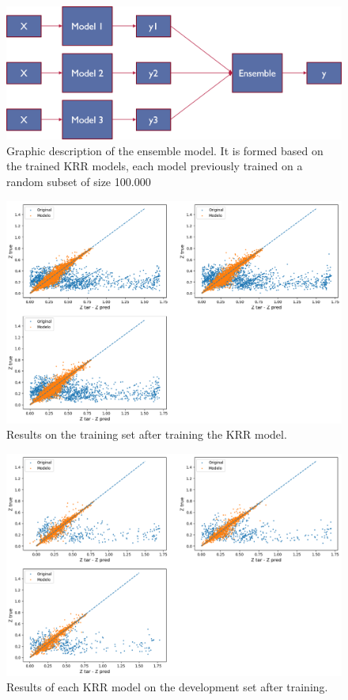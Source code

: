 \documentclass[]{article}
\begin{document}
\begin{figure}[h!]
	\centering
	\includegraphics[width=0.8\linewidth]{TeX_files/Imagenes/ensemble_model}
	\caption{Graphic description of the ensemble model. It is formed based on the trained KRR models, each model previously trained on a random subset of size 100.000}
	\label{fig:ensemblemodel}
\end{figure}
\begin{figure}[th!]
	\centering
	\includegraphics[width=1.0\linewidth]{TeX_files/Imagenes/krr-train}
	\caption{Results on the training set after training the KRR model.}
	\label{fig:krr-train}
\end{figure}
\begin{figure}[th!]
	\centering
	\includegraphics[width=1.0\linewidth]{TeX_files/Imagenes/krr-test}
	\caption{Results of each KRR model on the development set after training.}
	\label{fig:krr-test}
\end{figure}
\end{document}
